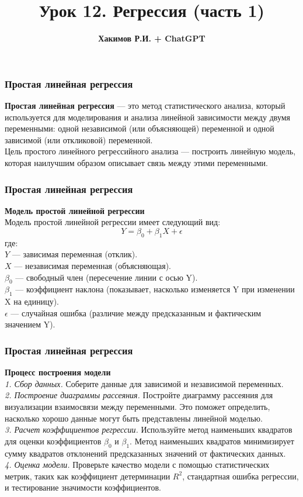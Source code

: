 \documentclass[aspectratio=169]{beamer}
\title{\bf Урок 12. Регрессия (часть 1)}
\author{{\bf Хакимов Р.И. + ChatGPT}}
\date[\today]{}
\begin{document}
\begin{frame}
\titlepage
\end{frame}

\begin{frame}
\frametitle{Простая линейная регрессия}
{\bf Простая линейная регрессия} — это метод статистического анализа, который используется для моделирования и анализа линейной зависимости между двумя переменными: одной независимой (или объясняющей) переменной и одной зависимой (или откликовой) переменной.\\
Цель простого линейного регрессийного анализа — построить линейную модель, которая наилучшим образом описывает связь между этими переменными.
\end{frame}

\begin{frame}
\frametitle{Простая линейная регрессия}
{\bf  Модель простой линейной регрессии}\\
Модель простой линейной регрессии имеет следующий вид:
\[
Y = \beta_0 + \beta_1 X + \epsilon
\]
где:\\
\quad \( Y \) — зависимая переменная (отклик).\\
\quad \( X \) — независимая переменная (объясняющая).\\
\quad \( \beta_0 \) — свободный член (пересечение линии с осью Y).\\
\quad \( \beta_1 \) — коэффициент наклона (показывает, насколько изменяется Y при изменении X на единицу).\\
\quad \( \epsilon \) — случайная ошибка (различие между предсказанным и фактическим значением Y).
\end{frame}

\begin{frame}
\frametitle{Простая линейная регрессия}
{\bf Процесс построения модели}\\
{\it 1. Сбор данных.} Соберите данные для зависимой и независимой переменных.\\
{\it 2. Построение диаграммы рассеяния.} Постройте диаграмму рассеяния для визуализации взаимосвязи между переменными. Это поможет определить, насколько хорошо данные могут быть представлены линейной моделью.\\
{\it 3. Расчет коэффициентов регрессии.} Используйте метод наименьших квадратов для оценки коэффициентов \( \beta_0 \) и \( \beta_1 \). Метод наименьших квадратов минимизирует сумму квадратов отклонений предсказанных значений от фактических данных.\\
{\it 4. Оценка модели.} Проверьте качество модели с помощью статистических метрик, таких как коэффициент детерминации \( R^2 \), стандартная ошибка регрессии, и тестирование значимости коэффициентов.
\end{frame}
\end{document}
